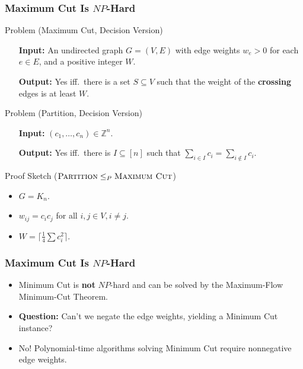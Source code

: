 \documentclass{beamer}
\newcommand{\ZZ}{\mathbb{Z}}
\begin{document}
    \begin{frame}
        \frametitle{{\sc Maximum Cut} Is $NP$-Hard}
    
        \begin{block}{Problem ({\sc Maximum Cut}, Decision Version)}
            \setlength{\leftmargini}{4em}
            \begin{itemize}
                \item[\bf Input:] An undirected graph $G = (V, E)$ with edge weights $w_e > 0$ for each $e \in E$, and a positive integer $W$.
                \item[\bf Output:] Yes iff.\ there is a set $S \subseteq V$ such that the weight of the {\bf crossing} edges is at least $W$.
            \end{itemize}
        \end{block}

        \pause

        \begin{block}{Problem ({\sc Partition}, Decision Version)}
            \setlength{\leftmargini}{4em}
            \begin{itemize}
                \item[\bf Input:] $(c_1, \ldots, c_n) \in \ZZ^n$.
                \item[\bf Output:] Yes iff.\ there is $I \subseteq [n]$ such that $\sum_{i \in I} c_i = \sum_{i \not \in I} c_i$.
            \end{itemize}
        \end{block}

        \pause

        \begin{block}{Proof Sketch ($\textsc{Partition} \leq_P \textsc{Maximum Cut}$)}
            \begin{itemize}
                \item $G = K_n$.
                \item $w_{ij} = c_i c_j$ for all $i, j \in V, i \neq j$.
                \item $W = \lceil \frac{1}{4} \sum c_i^2 \rceil$.
            \end{itemize}
        \end{block}
    \end{frame}

    \begin{frame}
        \frametitle{{\sc Maximum Cut} Is $NP$-Hard}
    
        \begin{itemize}
            \item {\sc Minimum Cut} is {\bf not} $NP$-hard and can be solved by the Maximum-Flow Minimum-Cut Theorem. \pause
            \item {\bf Question:} Can't we negate the edge weights, yielding a {\sc Minimum Cut} instance? \pause
            \item No! Polynomial-time algorithms solving {\sc Minimum Cut} require nonnegative edge weights.
        \end{itemize}
    \end{frame}
\end{document}
